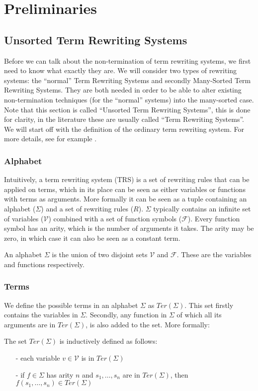 \chapter{Preliminaries}\label{preliminaries}
\section{Unsorted Term Rewriting Systems}\label{sec:trs}
Before we can talk about the non-termination of term rewriting systems, we first need to know what exactly they are. We will consider two types of rewriting systems: the ``normal'' Term Rewriting Systems and secondly Many-Sorted Term Rewriting Systems. They are both needed in order to be able to alter existing non-termination techniques (for the ``normal'' systems) into the many-sorted case. Note that this section is called ``Unsorted Term Rewriting Systems'', this is done for clarity, in the literature these are usually called ``Term Rewriting Systems''. We will start off with the definition of the ordinary term rewriting system. For more details, see for example \cite{Klop:1993:TRS:162552.162559}.
\subsection{Alphabet}
Intuitively, a term rewriting system (TRS) is a set of rewriting rules that can be applied on terms, which in its place can be seen as either variables or functions with terms as arguments. More formally it can be seen as a tuple containing an alphabet ($\Sigma$) and a set of rewriting rules ($R$). $\Sigma$ typically contains an infinite set of variables ($\mathcal{V}$) combined with a set of function symbols ($\mathcal{F}$). Every function symbol has an arity, which is the number of arguments it takes. The arity may be zero, in which case it can also be seen as a constant term.  
\begin{definition}
An alphabet $\Sigma$ is the union of two disjoint sets $\mathcal{V}$ and $\mathcal{F}$. These are the variables and functions respectively.
\end{definition}

\subsection{Terms}
We define the possible terms in an alphabet $\Sigma$ as $\textit{Ter}\left(\Sigma\right)$. This set firstly contains the variables in $\Sigma$. Secondly, any function in $\Sigma$ of which all its arguments are in $\textit{Ter}\left(\Sigma\right)$, is also added to the set. More formally: 
\begin{definition}\label{def:untypedterms}
The set $\textit{Ter}\left(\Sigma\right)$ is inductively defined as follows:
\begin{itemize}
    \itemsep -0.5em
    \item[-] each variable $v \in \mathcal{V}$ is in $\textit{Ter}\left(\Sigma\right)$
    \item[-] if $f \in \Sigma$ has arity $n$ and $s_1, \dots, s_n$ are in $\textit{Ter}\left(\Sigma\right)$, then $f(s_1, \dots, s_n) \in \textit{Ter}(\Sigma)$
\end{itemize}
\end{definition}

